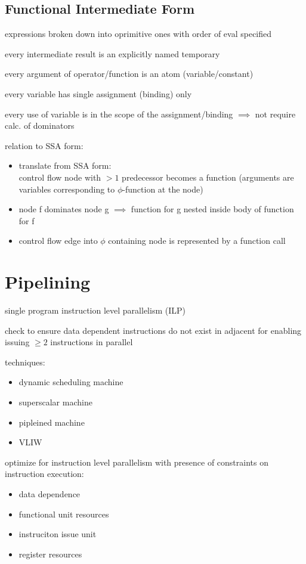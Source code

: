 \documentclass[8pt]{extarticle}
\begin{document}
\begin{multicols*}{2}
  \subsection{Functional Intermediate Form}
  expressions broken down into oprimitive ones with order of eval specified

  every intermediate result is an explicitly named temporary

  every argument of operator/function is an atom (variable/constant)

  every variable has single assignment (binding) only

  every use of variable is in the scope of the assignment/binding $\implies$ not require calc. of dominators

  relation to SSA form:
  \begin{itemize}
  \item translate from SSA form:\\
    control flow node with $>1$ predecessor becomes a function (arguments are variables corresponding to $\phi$-function at the node)
  \item node f dominates node g $\implies$ function for g nested inside body of function for f
  \item control flow edge into $\phi$ containing node is represented by a function call
  \end{itemize}
  
  \vfill\null
  \columnbreak

  \section{Pipelining}

  single program instruction level parallelism (ILP)

  check to ensure data dependent instructions do not exist in adjacent for enabling issuing $\geq2$ instructions in parallel

  techniques:

  \begin{itemize}
  \item dynamic scheduling machine
  \item superscalar machine
  \item pipleined machine
  \item VLIW
  \end{itemize}

  optimize for instruction level parallelism with presence of constraints on instruction execution:
  \begin{itemize}
  \item data dependence
  \item functional unit resources
  \item instruciton issue unit
  \item register resources
  \end{itemize}


\end{multicols*}
\end{document}
